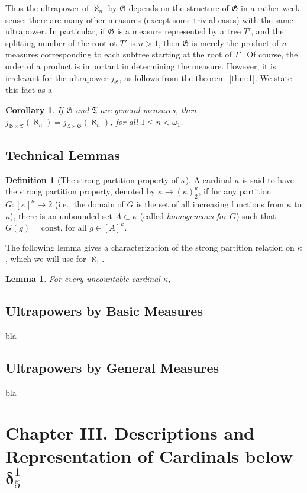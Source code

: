 \documentclass[bibother]{asl}
\newtheorem{cor}[thm]{Corollary}
\newtheorem{lem}[thm]{Lemma}
\theoremstyle{definition}
\newtheorem{defn}[thm]{Definition}
\theoremstyle{remark}
\newcommand{\bd}{\boldsymbol{\delta}}
\newcommand{\om}{\omega}
\newcommand{\al}[1]{{\aleph_{#1}}}
\newcommand{\sT}{\mathfrak{T}}
\newcommand{\sG}{\mathfrak{G}}
\begin{document}
Thus the ultrapower of $\al{n}$ by $\sG$ depends on the structure of $\sG$ in a rather week sense:
there are many other measures (except some trivial cases) with the same ultrapower.
In particular, if $\sG$ is a measure represented by a tree $T'$, and the splitting number of the root ot $T'$ is
$n>1$, then $\sG$ is merely the product of $n$ measures corresponding to each subtree starting at the root of $T'$.
Of course, the order of a product is important in determining the measure. 
However, it is irrelevant for the ultrapower $j_\sG$, as follows from the theorem~\ref{thm:1}.
We state this fact as a
\begin{cor}
If $\sG$ and $\sT$ are general measures, then $j_{\sG\times \sT}(\al{n}) = j_{\sT\times \sG}(\al{n})$, for all $1\le n < \om_1$.
\end{cor}

\subsection{Technical Lemmas} 
\begin{defn}[The strong partition property of $\kappa$]
A cardinal $\kappa$ is said to have the strong partition property, denoted by $\kappa\longrightarrow(\kappa)^\kappa_2$,
if for any partition $G:[\kappa]^\kappa \to 2$ (i.e., the domain of $G$ is the set of all increasing functions from $\kappa$ to  $\kappa$), there is an unbounded set $A\subset \kappa$ (called {\em homogeneous for $G$})
such that $G(g)=\textrm{const}$, for all $g\in [A]^\kappa$.
\end{defn}

The following lemma gives a characterization of the strong partition relation on $\kappa$, which we will use for $\al{1}$.
\begin{lem}
For every uncountable cardinal $\kappa$, 
\end{lem}

\subsection{Ultrapowers by Basic Measures} bla
\subsection{Ultrapowers by General Measures} bla

\section{Chapter III. Descriptions and Representation of Cardinals below $\bd^1_5$} 
\end{document}
